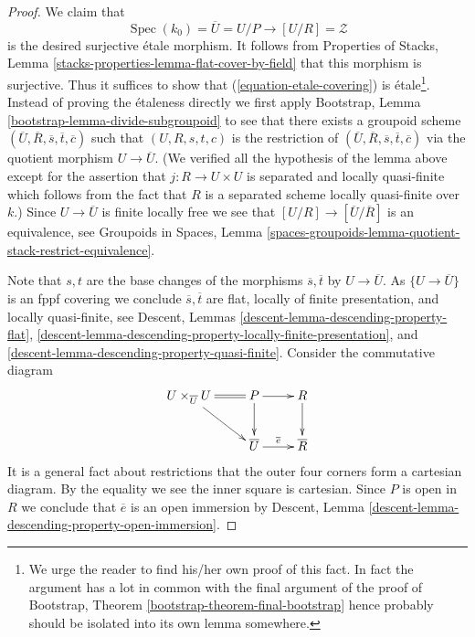 \documentclass[10pt,a4paper]{amsart}
\theoremstyle{plain}
\theoremstyle{definition}
\theoremstyle{remark}
\numberwithin{equation}{subsection}
\def\Spec{\mathop{\mathrm{Spec}}}
\begin{document}
\begin{proof}
\medskip\noindent
We claim that
\begin{equation}
\label{equation-etale-covering}
\Spec(k_0) = \overline{U} = U/P \to [U/R] = \mathcal{Z}
\end{equation}
is the desired surjective \'etale morphism. It follows from
Properties of Stacks, Lemma \ref{stacks-properties-lemma-flat-cover-by-field}
that this morphism is surjective. Thus it suffices to show that
(\ref{equation-etale-covering}) is \'etale\footnote{We urge the
reader to find his/her own proof of this fact. In fact the argument
has a lot in common with the final argument of the proof of
Bootstrap, Theorem \ref{bootstrap-theorem-final-bootstrap}
hence probably should be isolated into its own lemma somewhere.}.
Instead of proving the \'etaleness
directly we first apply
Bootstrap, Lemma \ref{bootstrap-lemma-divide-subgroupoid}
to see that there exists a groupoid scheme
$(\overline{U}, \overline{R}, \overline{s}, \overline{t}, \overline{c})$
such that $(U, R, s, t, c)$ is the restriction of
$(\overline{U}, \overline{R}, \overline{s}, \overline{t}, \overline{c})$
via the quotient morphism $U \to \overline{U}$.
(We verified all the hypothesis of the lemma above except for the assertion
that $j : R \to U \times U$ is separated and locally quasi-finite
which follows from the fact that $R$ is a separated scheme locally quasi-finite
over $k$.) Since $U \to \overline{U}$ is finite locally free
we see that $[U/R] \to [\overline{U}/\overline{R}]$ is an equivalence, see
Groupoids in Spaces,
Lemma \ref{spaces-groupoids-lemma-quotient-stack-restrict-equivalence}.

\medskip\noindent
Note that $s, t$ are the base changes of the morphisms
$\overline{s}, \overline{t}$ by $U \to \overline{U}$.
As $\{U \to \overline{U}\}$ is an fppf covering we conclude
$\overline{s}, \overline{t}$ are flat, locally of finite presentation, and
locally quasi-finite, see
Descent, Lemmas \ref{descent-lemma-descending-property-flat},
\ref{descent-lemma-descending-property-locally-finite-presentation}, and
\ref{descent-lemma-descending-property-quasi-finite}.
Consider the commutative diagram
$$
\xymatrix{
U \times_{\overline{U}} U \ar@{=}[r] \ar[rd] & P \ar[r] \ar[d] & R \ar[d] \\
& \overline{U} \ar[r]^{\overline{e}} & \overline{R}
}
$$
It is a general fact about restrictions that the outer four corners
form a cartesian diagram. By the equality we see the inner square is
cartesian. Since $P$ is open in $R$ we conclude that $\overline{e}$
is an open immersion by
Descent, Lemma \ref{descent-lemma-descending-property-open-immersion}.


\end{proof}
\end{document}
